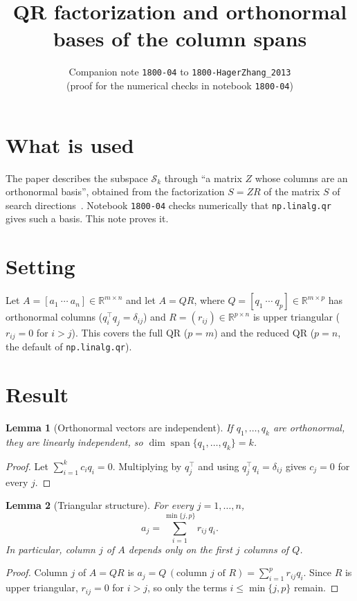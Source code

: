 \documentclass[11pt]{article}
\title{QR factorization and orthonormal bases of the column spans}
\author{Companion note \texttt{1800-04} to \texttt{1800-HagerZhang\_2013}\\
(proof for the numerical checks in notebook \texttt{1800-04})}
\date{}
\newtheorem{lemma}{Lemma}
\newcommand{\R}{\mathbb{R}}
\newcommand{\spn}{\operatorname{span}}
\begin{document}
\maketitle

\section{What is used}

The paper describes the subspace $\mathcal S_k$ through ``a matrix $Z$ whose
columns are an orthonormal basis'', obtained from the factorization $S=ZR$ of
the matrix $S$ of search directions~\cite[p.~2163]{HZ13}. Notebook
\texttt{1800-04} checks numerically that \texttt{np.linalg.qr} gives such a
basis. This note proves it.

\section{Setting}

Let $A=[a_1\ \cdots\ a_n]\in\R^{m\times n}$ and let $A=QR$, where
$Q=[q_1\ \cdots\ q_p]\in\R^{m\times p}$ has orthonormal columns
($q_i^{\top}q_j=\delta_{ij}$) and $R=(r_{ij})\in\R^{p\times n}$ is upper
triangular ($r_{ij}=0$ for $i>j$). This covers the full QR ($p=m$) and the
reduced QR ($p=n$, the default of \texttt{np.linalg.qr}).

\section{Result}

\begin{lemma}[Orthonormal vectors are independent]\label{lem:indep}
If $q_1,\dots,q_k$ are orthonormal, they are linearly independent, so
$\dim\spn\{q_1,\dots,q_k\}=k$.
\end{lemma}

\begin{proof}
Let $\sum_{i=1}^k c_iq_i=0$. Multiplying by $q_j^{\top}$ and using
$q_j^{\top}q_i=\delta_{ij}$ gives $c_j=0$ for every $j$.
\end{proof}

\begin{lemma}[Triangular structure]\label{lem:tri}
For every $j=1,\dots,n$,
\[
a_j=\sum_{i=1}^{\min\{j,p\}} r_{ij}\,q_i .
\]
In particular, column $j$ of $A$ depends only on the first $j$ columns of $Q$.
\end{lemma}

\begin{proof}
Column $j$ of $A=QR$ is $a_j=Q\,(\text{column $j$ of $R$})=\sum_{i=1}^{p}r_{ij}q_i$.
Since $R$ is upper triangular, $r_{ij}=0$ for $i>j$, so only the terms
$i\le\min\{j,p\}$ remain.
\end{proof}
\end{document}

